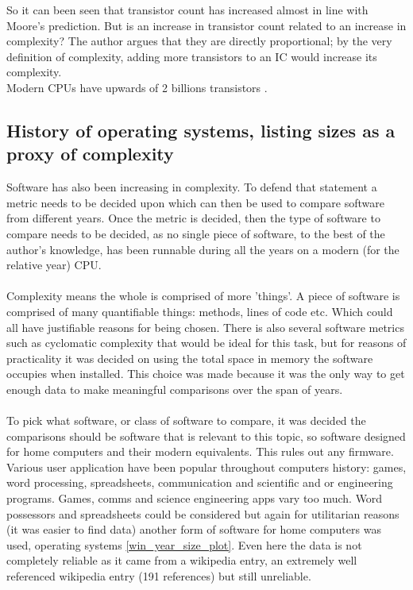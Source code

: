So it can been seen that transistor count has increased almost in line with Moore's prediction. But is an increase in transistor count related to an increase in complexity? The author argues that they are directly proportional; by the very definition of complexity, adding more transistors to an IC would increase its complexity. \\

Modern CPUs have upwards of 2 billions transistors \cite{2Bbeast}.

\subsection{History of operating systems, listing sizes as a proxy of complexity}
Software has also been increasing in complexity. To defend that statement a metric needs to be decided upon which can then be used to compare software from different years. Once the metric is decided, then the type of software to compare needs to be decided, as no single piece of software, to the best of the author's knowledge, has been runnable during all the years on a modern (for the relative year) CPU. \\\\

Complexity means the whole is comprised of more 'things'. A piece of software is comprised of many quantifiable things: methods, lines of code etc. Which could all have justifiable reasons for being chosen. There is also several software metrics such as cyclomatic complexity that would be ideal for this task, but for reasons of practicality it was decided on using the total space in memory the software occupies when installed. This choice was made because it was the only way to get enough data to make meaningful comparisons over the span of years.\\\\

To pick what software, or class of software to compare, it was decided the comparisons should be software that is relevant to this topic, so software designed for home computers and their modern equivalents. This rules out any firmware. Various user application have been popular throughout computers history: games, word processing, spreadsheets, communication and scientific and or engineering  programs. Games, comms and science engineering apps vary too much. Word possessors and spreadsheets could be considered but again for utilitarian reasons (it was easier to find data) another form of software for home computers was used, operating systems \ref{win_year_size_plot}. Even here the data is not completely reliable as it came from a wikipedia entry, an extremely well referenced wikipedia entry (191 references) but still unreliable.\\\\

